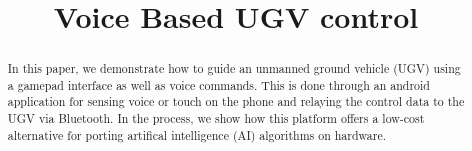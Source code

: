 \documentclass[conference]{IEEEtran}
\begin{document}

\title{Voice Based UGV control}
\author{
}

\maketitle


\renewcommand{\thefigure}{\theenumi}
\renewcommand{\thetable}{\theenumi}

\bigskip

\begin{abstract}
In this paper, we demonstrate how to guide an unmanned ground vehicle (UGV) using a gamepad interface as well as voice commands. This is done through an android application for sensing voice or touch on the phone and  relaying the control data to the UGV via Bluetooth.  In the process, we show how this platform 
offers a low-cost alternative for porting artifical intelligence (AI) algorithms on hardware.  

\end{abstract}
\end{document}
